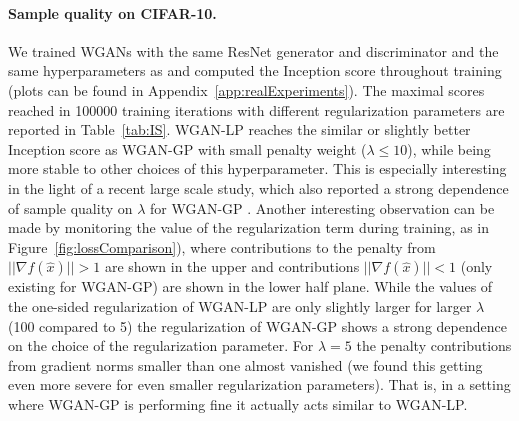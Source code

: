 \documentclass{article} %
\newcommand{\af}[1]{\textcolor{blue}{#1}}
\newcommand{\hp}[1]{\textcolor{red}{#1}}
\begin{document}
\paragraph{Sample quality on CIFAR-10.} We trained  WGANs with the same  ResNet generator and discriminator and the same hyperparameters as \citet{iWGAN} 
and computed the Inception score \citep{iGAN} throughout training (plots can be found in Appendix~\ref{app:realExperiments}).
The 
maximal scores reached in 100000 training iterations with different regularization parameters are reported in Table~\ref{tab:IS}.
WGAN-LP reaches the similar or slightly better Inception score as WGAN-GP with small penalty weight ($\lambda \leq 10$), while being more stable to other choices of this hyperparameter. This is especially interesting in the light of a recent large scale study, which also reported a strong dependence of  sample quality on $\lambda$ for WGAN-GP \citep[see, Figure 8 and 9 in ][]{GANsCreatedEqual}.
Another interesting observation can be made by monitoring the value of the regularization term during training, as in Figure~\ref{fig:lossComparison}), where contributions to the penalty from $||\nabla f(\hat{x})||>1$  are shown in the upper and contributions $|| \nabla f(\hat{x})||<1$ (only existing for WGAN-GP) are shown in the lower half plane. While the values of the one-sided regularization of WGAN-LP are only slightly  larger for larger $\lambda$  (100 compared to 5) the regularization of WGAN-GP shows a strong dependence on the choice of the regularization parameter. 
For $\lambda=5$ the penalty contributions from gradient norms smaller than one almost vanished (we found this getting even more severe for even smaller regularization parameters). That is, in a setting where WGAN-GP is performing fine it actually acts similar to WGAN-LP.



\end{document}
